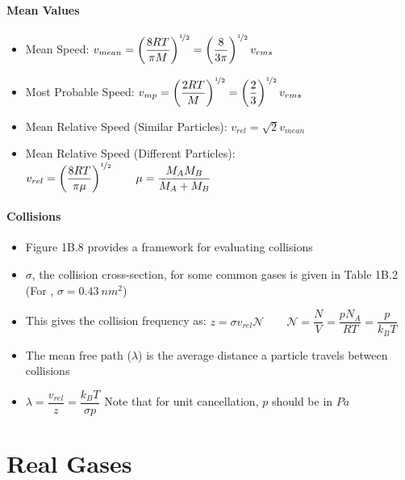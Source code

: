 \documentclass[12pt, openany, letterpaper]{memoir}
\begin{document}
\paragraph{Mean Values}
\begin{itemize}
	\item Mean Speed: $v_{mean} = \left(\dfrac{8RT}{\pi M}\right)^{\nicefrac{1}{2}} = \left(\dfrac{8}{3\pi}\right)^{\nicefrac{1}{2}}v_{rms}$
	\item Most Probable Speed: $v_{mp} = \left(\dfrac{2RT}{ M}\right)^{\nicefrac{1}{2}} = \left(\dfrac{2}{3}\right)^{\nicefrac{1}{2}}v_{rms}$
	\item Mean Relative Speed (Similar Particles): $v_{rel}=\sqrt{2}v_{mean}$
	\item Mean Relative Speed (Different Particles): $v_{rel} = \left(\dfrac{8RT}{\pi\mu}\right)^{\nicefrac{1}{2}} \hspace{2em} \mu = \dfrac{M_AM_B}{M_A+M_B}$
\end{itemize}
\paragraph{Collisions}
\begin{itemize}
	\item Figure 1B.8 provides a framework for evaluating collisions
	\item $\sigma$, the collision cross-section, for some common gases is given in Table 1B.2 (For , $\sigma = 0.43~nm^2$)
	\item This gives the collision frequency as: $z=\sigma v_{rel}\mathcal{N}\hspace{2em}\mathcal{N} = \dfrac{N}{V} = \dfrac{pN_A}{RT} = \dfrac{p}{k_BT}$
	\item The mean free path ($\lambda$) is the average distance a particle travels between collisions
	\item $\lambda = \dfrac{v_{rel}}{z} = \dfrac{k_BT}{\sigma p}$ \hspace{2em} Note that for unit cancellation, $p$ should be in $Pa$
\end{itemize}

\section{Real Gases}
\end{document}
